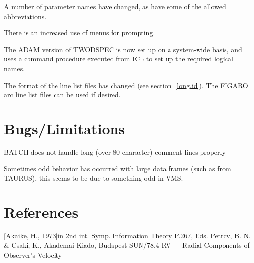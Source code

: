 \begin{list}{()}{}
\item
A number of parameter names have changed, as have some of the allowed
abbreviations.

\item
There is an increased use of menus for prompting.

\item
The ADAM version of TWODSPEC is now set up on a system-wide basis, and
uses a command procedure executed from ICL to set up the required
logical names.

\item
The format of the line list files has changed (see
section~\ref{long.id}).
The FIGARO arc line list files can be used if desired.

\end{list}

\section{Bugs/Limitations}

BATCH does not handle long (over 80 character) comment lines properly.

Sometimes odd behavior has occurred with large data frames (such as from
TAURUS), this seems to be due to something odd in VMS.


\section*{References}
\begin{description}
\cref{Akaike, H., 1973}{in 2nd int. Symp. Information Theory}
{P.267, Eds. Petrov, B. N. \& Csaki, K., Akademai Kiado, Budapest}{} 
{SUN/78.4 RV --- Radial Components of Observer's Velocity}
\end{description}

